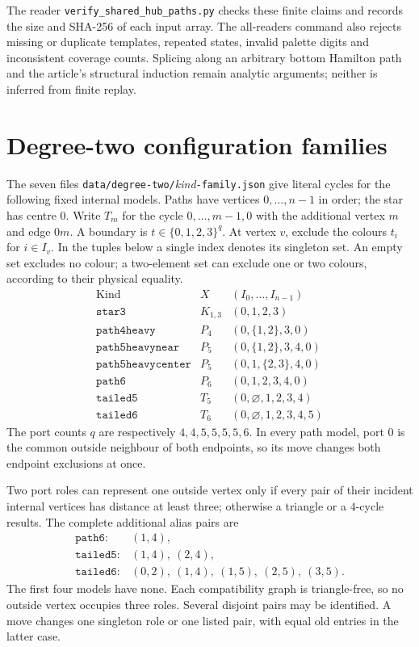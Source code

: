 \documentclass[11pt]{article}
\numberwithin{equation}{section}
\numberwithin{table}{section}
\begin{document}
The reader \texttt{verify\_shared\_hub\_paths.py} checks these finite
claims and records the size and SHA-256 of each input array.
The all-readers command also rejects missing or duplicate templates,
repeated states, invalid palette digits and inconsistent coverage counts.
Splicing along an
arbitrary bottom Hamilton path and the article's structural induction
remain analytic arguments; neither is inferred from finite replay.

\clearpage
\section{Degree-two configuration families}
\label{app:degree-two-family-certificates}
The seven files \texttt{data/degree-two/}\emph{kind}\texttt{-family.json}
give literal cycles for the following fixed internal models. Paths have
vertices $0,\ldots,n-1$ in order; the star has centre $0$.
Write $T_m$ for the cycle $0,\ldots,m-1,0$ with the additional vertex
$m$ and edge $0m$. A boundary is $t\in\{0,1,2,3\}^q$.
At vertex $v$, exclude the colours $t_i$ for $i\in I_v$.
In the tuples below a single index denotes its singleton set.
An empty set excludes no colour; a two-element set can exclude one
or two colours, according to their physical equality.
\[
\begin{array}{lcl}
\text{Kind}&X&(I_0,\ldots,I_{n-1})\\ \hline
\mathtt{star3}&K_{1,3}&(0,1,2,3)\\
\mathtt{path4heavy}&P_4&(0,\{1,2\},3,0)\\
\mathtt{path5heavynear}&P_5&(0,\{1,2\},3,4,0)\\
\mathtt{path5heavycenter}&P_5&(0,1,\{2,3\},4,0)\\
\mathtt{path6}&P_6&(0,1,2,3,4,0)\\
\mathtt{tailed5}&T_5&(0,\varnothing,1,2,3,4)\\
\mathtt{tailed6}&T_6&(0,\varnothing,1,2,3,4,5)
\end{array}
\]
The port counts $q$ are respectively $4,4,5,5,5,5,6$.
In every path model, port $0$ is the common outside neighbour of both
endpoints, so its move changes both endpoint exclusions at once.

Two port roles can represent one outside vertex only if every pair
of their incident internal vertices has distance at least three;
otherwise a triangle or a $4$-cycle results. The complete additional
alias pairs are
\[
\begin{array}{ll}
\mathtt{path6}:&(1,4),\\
\mathtt{tailed5}:&(1,4),\ (2,4),\\
\mathtt{tailed6}:&(0,2),\ (1,4),\ (1,5),\ (2,5),\ (3,5).
\end{array}
\]
The first four models have none. Each compatibility graph is
triangle-free, so no outside vertex occupies three roles. Several
disjoint pairs may be identified. A move changes one singleton role
or one listed pair, with equal old entries in the latter case.
\end{document}
